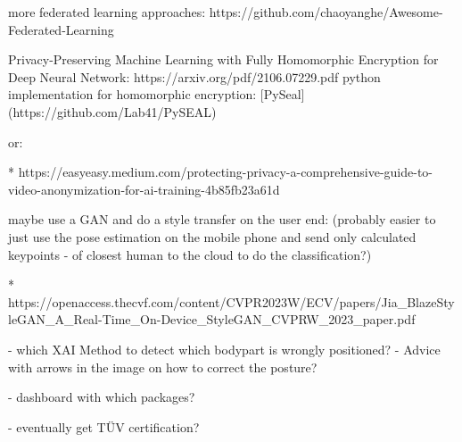 more federated learning approaches:
https://github.com/chaoyanghe/Awesome-Federated-Learning

Privacy-Preserving Machine Learning with Fully Homomorphic Encryption for Deep Neural Network:
https://arxiv.org/pdf/2106.07229.pdf
python implementation for homomorphic encryption: [PySeal](https://github.com/Lab41/PySEAL)

or:

* https://easyeasy.medium.com/protecting-privacy-a-comprehensive-guide-to-video-anonymization-for-ai-training-4b85fb23a61d

maybe use a GAN and do a style transfer on the user end:
(probably easier to just use the pose estimation on the mobile phone 
and send only calculated keypoints - of closest human to the cloud to do the classification?)

* https://openaccess.thecvf.com/content/CVPR2023W/ECV/papers/Jia_BlazeStyleGAN_A_Real-Time_On-Device_StyleGAN_CVPRW_2023_paper.pdf


- which XAI Method to detect which bodypart is wrongly positioned?
- Advice with arrows in the image on how to correct the posture?

- dashboard with which packages?

- eventually get TÜV certification?
